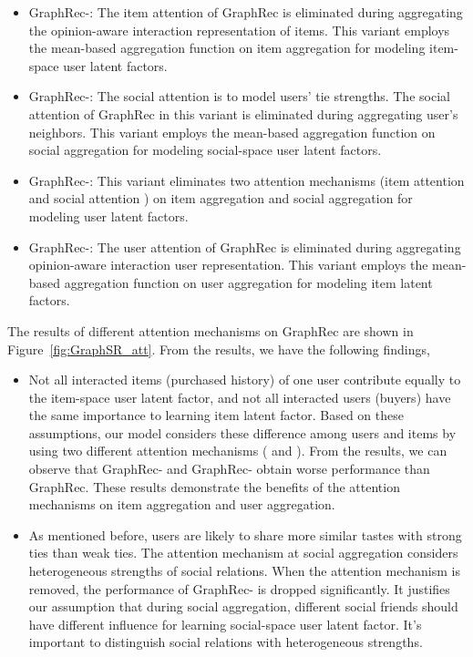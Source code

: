 \documentclass[sigconf]{acmart} \copyrightyear{2019}
\begin{document}
\begin{itemize}
    \item GraphRec-: The item attention  of GraphRec is eliminated during aggregating the opinion-aware interaction representation of items. This variant employs the mean-based aggregation function on item aggregation for modeling item-space user latent factors.
    \item GraphRec-: The social attention  is to model users' tie strengths. The social attention  of GraphRec in this variant is eliminated during aggregating user's neighbors. This variant employs the mean-based aggregation function on social aggregation for modeling social-space user latent factors.
    \item GraphRec-: This variant eliminates two attention mechanisms (item attention  and social attention ) on item aggregation and social aggregation for modeling user latent factors. 
    \item GraphRec-: The user attention  of GraphRec is eliminated during aggregating opinion-aware interaction user representation. This variant employs the mean-based aggregation function on user aggregation for modeling item latent factors.
\end{itemize}


The results of different attention mechanisms on GraphRec are shown in Figure~\ref{fig:GraphSR_att}. From the results, we have the following findings,

\begin{itemize}
  \item Not all interacted items (purchased history) of one user contribute equally to the item-space user latent factor, and not all interacted users (buyers) have the same importance to learning item latent factor. Based on these assumptions, our model considers these difference among users and items by using two different attention mechanisms ( and ). From the results, we can observe that GraphRec- and GraphRec- obtain worse performance than GraphRec. These results demonstrate the benefits of the attention mechanisms on item aggregation and user aggregation.
  
  \item As mentioned before, users are likely to share more similar tastes with strong ties than weak ties. The attention mechanism  at social aggregation considers heterogeneous strengths of social relations. When the attention mechanism  is removed, the performance of GraphRec- is dropped significantly. It justifies our assumption that during social aggregation, different social friends should have different influence for learning social-space user latent factor. It's important to distinguish social relations with heterogeneous strengths.
  
\end{itemize}
\end{document}
